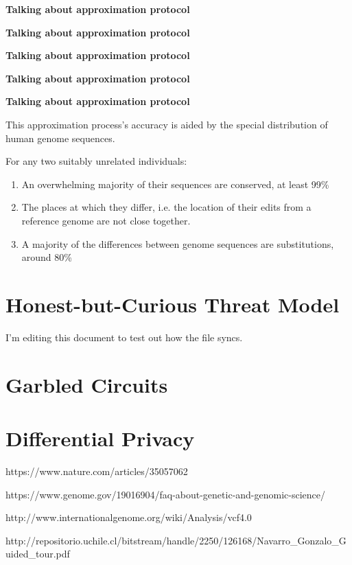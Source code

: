 \documentclass[12pt]{article}
\begin{document}
\textbf{{Talking about approximation protocol}}

\textbf{{Talking about approximation protocol}}

\textbf{{Talking about approximation protocol}}

\textbf{{Talking about approximation protocol}}

\textbf{{Talking about approximation protocol}}

This approximation process's accuracy is aided by the special distribution of human genome sequences.

For any two suitably unrelated individuals:

\begin{enumerate}
\item An overwhelming majority of their sequences are conserved, at least 99\%
\item The places at which they differ, i.e. the location of their edits from a reference genome are not close together.
\item A majority of the differences between genome sequences are substitutions, around 80\%
\end{enumerate}

\section{Honest-but-Curious Threat Model}

I'm editing this document to test out how the file syncs.

\section{Garbled Circuits}

\section{Differential Privacy}


\begin{thebibliography}{9}
  https://www.nature.com/articles/35057062

  https://www.genome.gov/19016904/faq-about-genetic-and-genomic-science/

  http://www.internationalgenome.org/wiki/Analysis/vcf4.0
  
  http://repositorio.uchile.cl/bitstream/handle/2250/126168/Navarro\_Gonzalo\_Guided\_tour.pdf

\end{thebibliography}
\end{document}
